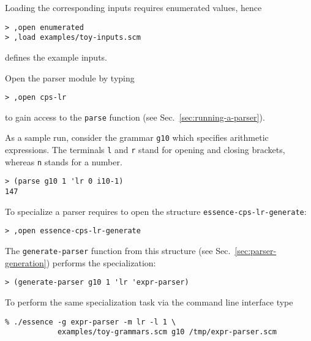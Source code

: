 \documentclass{article}
\newcommand{\codefont}[1]{\texttt{#1}}
\begin{document}
Loading the corresponding inputs requires enumerated values, hence
\begin{verbatim}
> ,open enumerated
> ,load examples/toy-inputs.scm
\end{verbatim}
defines the example inputs.

Open the parser module by typing
\begin{verbatim}
> ,open cps-lr
\end{verbatim}
to gain access to the \codefont{parse}
function (see Sec.~\ref{sec:running-a-parser}). 

As a sample run, consider the grammar \codefont{g10} which specifies arithmetic 
expressions. The terminals \codefont{l} and \codefont{r} stand for opening
and closing brackets, whereas \codefont{n} stands for a number.
\begin{verbatim}
> (parse g10 1 'lr 0 i10-1)
147
\end{verbatim}

To specialize a parser requires to open the structure
\codefont{essence-cps-lr-generate}:
\begin{verbatim}
> ,open essence-cps-lr-generate
\end{verbatim}
The \codefont{generate-parser} function from this structure (see
Sec.~\ref{sec:parser-generation}) performs the specialization:
\begin{verbatim}
> (generate-parser g10 1 'lr 'expr-parser)
\end{verbatim}

To perform the same specialization task via the command line interface type
\begin{verbatim}
% ./essence -g expr-parser -m lr -l 1 \
            examples/toy-grammars.scm g10 /tmp/expr-parser.scm
\end{verbatim}

 

\end{document}
